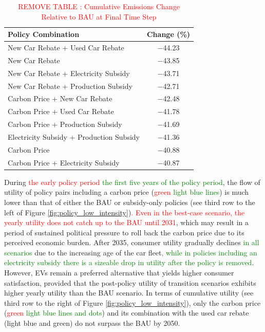 \documentclass[12pt]{article}
\begin{document}
    \begin{table}[h]
        \centering
        \caption{\textcolor{red}{REMOVE TABLE : Cumulative Emissions Change Relative to BAU at Final Time Step}}
        \label{tab:emissions}
        \begin{tabular}{lc}
            \toprule
            \textbf{Policy Combination} & \textbf{Change (\%)} \\
            \midrule
            New Car Rebate + Used Car Rebate & $-$44.23 \\
            New Car Rebate & $-$43.85 \\
            New Car Rebate + Electricity Subsidy & $-$43.71 \\
            New Car Rebate + Production Subsidy & $-$42.71 \\
            Carbon Price + New Car Rebate & $-$42.48 \\
            Carbon Price + Used Car Rebate & $-$41.78 \\
            Carbon Price + Production Subsidy & $-$41.69 \\
            Electricity Subsidy + Production Subsidy & $-$41.36 \\
            Carbon Price & $-$40.88 \\
            Carbon Price + Electricity Subsidy & $-$40.87 \\
            \bottomrule
        \end{tabular}
    \end{table}

	During \textcolor{red}{the early policy period} \textcolor{green}{the first five years of the policy period}, the flow of utility of policy pairs including a carbon price (\textcolor{red}{green} \textcolor{green}{light blue lines}) is much lower than that of either the BAU or subsidy-only policies (see third row to the left of Figure \ref{fig:policy_low_intensity})\textcolor{red}{. Even in the best-case scenario, the yearly utility does not catch up to the BAU until 2031}, which may result in a period of sustained political pressure to roll back the carbon price due to its perceived economic burden. After 2035, consumer utility gradually declines \textcolor{green}{in all scenarios} due to the increasing age of the car fleet\textcolor{green}{, while in policies including an electricity subsidy there is a sizeable drop in utility after the policy is removed}. However, EVs remain a preferred alternative that yields higher consumer satisfaction, provided that the post-policy utility of transition scenarios exhibits higher yearly utility than the BAU scenario. In terms of cumulative utility (see third row to the right of Figure \ref{fig:policy_low_intensity}), only the carbon price (\textcolor{red}{green} \textcolor{green}{light blue lines and dots}) and its combination with the used car rebate (light blue and green) do not surpass the BAU by 2050.
	
\end{document}
